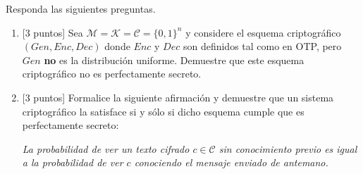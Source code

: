 
Responda las siguientes preguntas.
\begin{enumerate}
\item {[3 puntos]} Sea $\mathcal{M}=\mathcal{K}=\mathcal{C}=\{0, 1\}^n$ y considere el esquema criptográfico $(\textit{Gen}, \textit{Enc}, \textit{Dec})$ donde $\textit{Enc}$ y $\textit{Dec}$ son definidos tal como en OTP, pero $\textit{Gen}$ \textbf{no} es la distribución uniforme. Demuestre que este esquema criptográfico no es perfectamente secreto.

\item {[3 puntos]} Formalice la siguiente afirmación y demuestre que un sistema criptográfico la satisface si y sólo si dicho esquema cumple que es perfectamente secreto:
\begin{center}
  \it{La probabilidad de ver un texto cifrado $c\in \mathcal{C}$ sin conocimiento previo es igual a la probabilidad de ver $c$ conociendo el mensaje enviado de antemano.}
  \end{center}
\end{enumerate}
